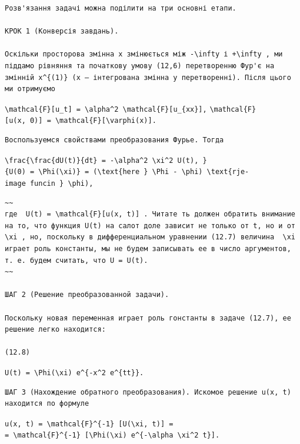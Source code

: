 \documentclass[
  ukrainian,
]{article}
\begin{document}
\begin{verbatim}
Розв'язання задачі можна поділити на три основні етапи.

КРОК 1 (Конверсія завдань).

Оскільки просторова змінна x змінюється між -\infty і +\infty , ми піддамо рівняння та початкову умову (12,6) перетворенню Фур'є на змінній x^{(1)} (x — інтегрована змінна у перетворенні). Після цього ми отримуємо
\end{verbatim}

\texttt{\textbackslash{}mathcal\{F\}{[}u\_t{]}\ =\ \textbackslash{}alpha\^{}2\ \textbackslash{}mathcal\{F\}{[}u\_\{xx\}{]},}
\texttt{\textbackslash{}mathcal\{F\}{[}u(x,\ 0){]}\ =\ \textbackslash{}mathcal\{F\}{[}\textbackslash{}varphi(x){]}.}

\begin{verbatim}
Воспользуемся свойствами преобразования Фурье. Тогда
\end{verbatim}

\texttt{\textbackslash{}frac\{\textbackslash{}frac\{dU(t)\}\{dt\}\ =\ -\textbackslash{}alpha\^{}2\ \textbackslash{}xi\^{}2\ U(t),\ \}\{U(0)\ =\ \textbackslash{}Phi(\textbackslash{}xi)\}\ =\ (\textbackslash{}text\{here\ \}\ \textbackslash{}Phi\ -\ \textbackslash{}phi)\ \textbackslash{}text\{rje-image\ funcin\ \}\ \textbackslash{}phi),}

\begin{verbatim}
~~
где  U(t) = \mathcal{F}[u(x, t)] . Читате ть должен обратить внимание на то, что функция U(t) на салот доле зависит не только от t, но и от  \xi , но, поскольку в дифференциальном уравнении (12.7) величина  \xi  играет роль константы, мы не будем записывать ее в число аргументов, т. е. будем считать, что U = U(t).
~~

ШАГ 2 (Решение преобразованной задачи).

Поскольку новая переменная играет роль гонстанты в задаче (12.7), ее решение легко находится:

(12.8)
\end{verbatim}

\texttt{U(t)\ =\ \textbackslash{}Phi(\textbackslash{}xi)\ e\^{}\{-x\^{}2\ e\^{}\{tt\}\}.}

\begin{verbatim}
ШАГ 3 (Нахождение обратного преобразования). Искомое решение u(x, t) находится по формуле
\end{verbatim}

\texttt{u(x,\ t)\ =\ \textbackslash{}mathcal\{F\}\^{}\{-1\}\ {[}U(\textbackslash{}xi,\ t){]}\ =}
\texttt{=\ \textbackslash{}mathcal\{F\}\^{}\{-1\}\ {[}\textbackslash{}Phi(\textbackslash{}xi)\ e\^{}\{-\textbackslash{}alpha\ \textbackslash{}xi\^{}2\ t\}{]}.}
\end{document}
